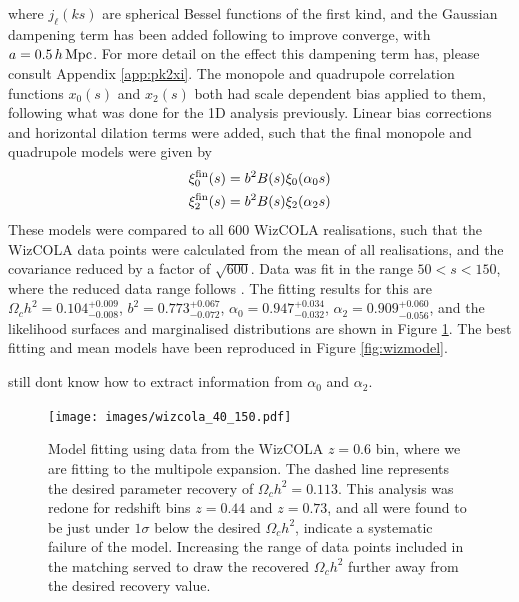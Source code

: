 \documentclass[titlesmallcaps, examinerscopy, copyrightpage]{uqthesis}
\newcommand{\red}{\color{red}}
\begin{document}
where $j_\ell(ks)$ are spherical Bessel functions of the first kind, and the Gaussian dampening term has been added following \citet{AndersonAubourg2012} to improve converge, with $a= 0.5\, h\, \rm{Mpc}$. For more detail on the effect this dampening term has, please consult Appendix \ref{app:pk2xi}. The monopole and quadrupole correlation functions $x_0(s)$ and $x_2(s)$ both had scale dependent bias applied to them, following what was done for the 1D analysis previously. Linear bias corrections and horizontal dilation terms were added, such that the final monopole and quadrupole models were given by
\begin{align}
\xi_0^{\rm{fin}}(s) &= b^2 B(s) \xi_0(\alpha_0 s) \\
\xi_2^{\rm{fin}}(s) &= b^2 B(s) \xi_2(\alpha_2 s)
\end{align}
These models were compared to all 600 WizCOLA realisations, such that the WizCOLA data points were calculated from the mean of all realisations, and the covariance reduced by a factor of $\sqrt{600}$. Data was fit in the range $50<s<150$, where the reduced data range follows \citet{ChuangWang2012}.  The fitting results for this are $\Omega_c h^2 = 0.104^{+0.009}_{-0.008}$, $b^2 = 0.773^{+0.067}_{-0.072}$, $\alpha_0 = 0.947^{+0.034}_{-0.032}$, $\alpha_2 = 0.909^{+0.060}_{-0.056}$, and the likelihood surfaces and marginalised distributions are shown in Figure \ref{fig:wizmp}. The best fitting and mean models have been reproduced in Figure \ref{fig:wizmodel}.


{\red still dont know how to extract information from $\alpha_0$ and $\alpha_2$.}


\begin{figure}[h!]
  \begin{center}
    \texttt{[image: images/wizcola\_40\_150.pdf]}
  \end{center}
  \caption{Model fitting using data from the WizCOLA $z=0.6$ bin, where we are fitting to the multipole expansion. The dashed line represents the desired parameter recovery of $\Omega_c h^2 = 0.113$. This analysis was redone for redshift bins $z=0.44$ and $z=0.73$, and all were found to be just under $1\sigma$ below the desired $\Omega_c h^2$, indicate a systematic failure of the model. Increasing the range of data points included in the matching served to draw the recovered $\Omega_c h^2$ further away from the desired recovery value.}
  \label{fig:wizmp}
\end{figure}
\end{document}
